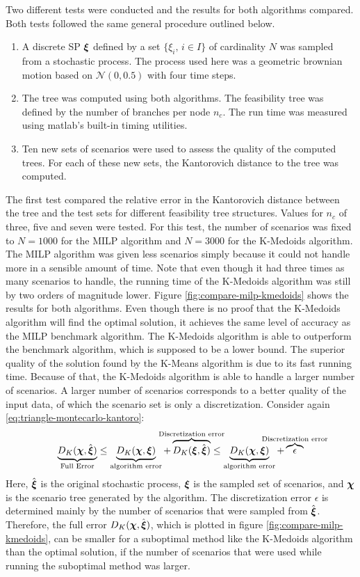 Two different tests were conducted and the results for both algorithms compared.
Both tests followed the same general procedure outlined below.
\begin{enumerate}
\item A discrete SP $\boldsymbol\xi$ defined by a set $\{\xi_i,\, i\in I\}$ of cardinality $N$ was sampled from a stochastic process.
  The process used here was a geometric brownian motion based on $\mathcal{N}(0,0.5)$ with four time steps.
\item The tree was computed using both algorithms.
  The feasibility tree was defined by the number of branches per node $n_c$.
  The run time was measured using {\sc matlab}'s built-in timing utilities.
\item Ten new sets of scenarios were used to assess the quality of the computed trees.
  For each of these new sets, the Kantorovich distance to the tree was computed.
\end{enumerate}

The first test compared the relative error in the Kantorovich distance between the tree and the test sets for different feasibility tree structures.
Values for $n_c$ of three, five and seven were tested.
For this test, the number of scenarios was fixed to $N=1000$ for the MILP algorithm and $N=3000$ for the K-Medoids algorithm.
The MILP algorithm was given less scenarios simply because it could not handle more in a sensible amount of time.
Note that even though it had three times as many scenarios to handle, the running time of the K-Medoids algorithm was still by two orders of magnitude lower.
Figure \ref{fig:compare-milp-kmedoids} shows the results for both algorithms.
Even though there is no proof that the K-Medoids algorithm will find the optimal solution, it achieves the same level of accuracy as the MILP benchmark algorithm.
The K-Medoids algorithm is able to outperform the benchmark algorithm, which is supposed to be a lower bound.
The superior quality of the solution found by the K-Means algorithm is due to its fast running time.
Because of that, the K-Medoids algorithm is able to handle a larger number of scenarios.
A larger number of scenarios corresponds to a better quality of the input data, of which the scenario set is only a discretization.
Consider again \eqref{eq:triangle-montecarlo-kantoro}:
\[\underbrace{D_K(\bs\chi,\hat{\bs\xi})}_{\text{Full Error}} \leq  \underbrace{D_K(\bs\chi, \bs\xi)}_{\text{algorithm error}} + \overbrace{D_K(\bs\xi,\hat{\bs\xi})}^{\mathclap{\text{Discretization error}}}\leq \underbrace{D_K(\bs\chi,\bs\xi)}_{\text{algorithm error}}+ \overbrace{\epsilon}^{\mathclap{\text{Discretization error}}}
\]
Here, $\hat{\boldsymbol\xi}$ is the original stochastic process, $\boldsymbol\xi$ is the sampled set of scenarios, and $\boldsymbol\chi$ is the scenario tree generated by the algorithm.
The discretization error $\epsilon$ is determined mainly by the number of scenarios that were sampled from $\hat{\boldsymbol\xi}$.
Therefore, the full error $D_K(\boldsymbol\chi,\hat{\boldsymbol\xi})$, which is plotted in figure \ref{fig:compare-milp-kmedoids}, can be smaller for a suboptimal method like the K-Medoids algorithm than the optimal solution, if the number of scenarios that were used while running the suboptimal method was larger.

